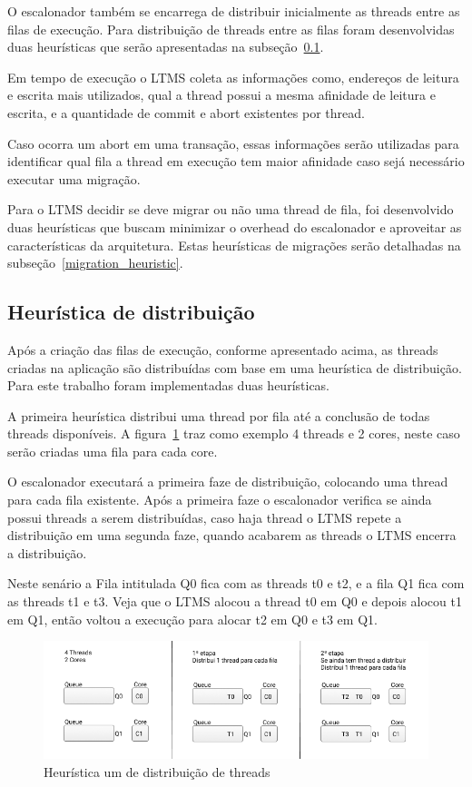 \documentclass[diss,capa]{texufpel}
\begin{document}
O escalonador também se encarrega de distribuir inicialmente as threads entre as filas de execução. Para distribuição de threads entre as filas foram desenvolvidas duas heurísticas que serão apresentadas na subseção~\ref{distribuition_heuristic}.

Em tempo de execução o LTMS coleta as informações como, endereços de leitura e escrita mais utilizados, qual a thread possui a mesma afinidade de leitura e escrita, e a quantidade de commit e abort existentes por thread.

Caso ocorra um abort em uma transação, essas informações serão utilizadas para identificar qual fila a thread em execução tem maior afinidade caso sejá necessário executar uma migração.

Para o LTMS decidir se deve migrar ou não uma thread de fila, foi desenvolvido duas heurísticas que buscam minimizar o overhead do escalonador e aproveitar as características da arquitetura. Estas heurísticas de migrações serão detalhadas na subseção~\ref{migration_heuristic}.

\subsection{Heurística de distribuição}
\label{distribuition_heuristic}

Após a criação das filas de execução, conforme apresentado acima, as threads criadas na aplicação são distribuídas com base em uma heurística de distribuição. Para este trabalho foram implementadas duas heurísticas.

A primeira heurística distribui uma thread por fila até a conclusão de todas threads disponíveis. A figura~\ref{queue_one} traz como exemplo 4 threads e 2 cores, neste caso serão criadas uma fila para cada core.

O escalonador executará a primeira faze de distribuição, colocando uma thread para cada fila existente. Após a primeira faze o escalonador verifica se ainda possui threads a serem distribuídas, caso haja thread o LTMS repete a distribuição em uma segunda faze, quando acabarem as threads o LTMS encerra a distribuição.

Neste senário a Fila intitulada Q0 fica com as threads t0 e t2, e a fila Q1 fica com as threads t1 e t3. Veja que o LTMS alocou a thread t0 em Q0 e depois alocou t1 em Q1, então voltou a execução para alocar t2 em Q0 e t3 em Q1.

\begin{figure}[htbp]
  \centering
  \includegraphics[scale=.6]{images/Queue_one.png}
\caption{Heurística um de distribuição de threads}
\label{queue_one}
\end{figure}
\end{document}
